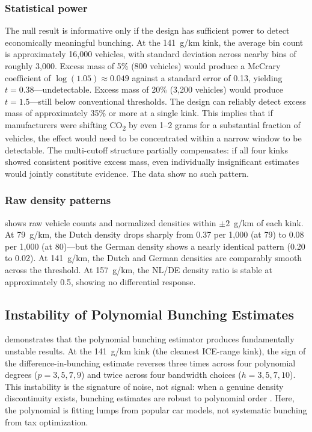 \documentclass[12pt]{article}
\begin{document}
\subsubsection*{Statistical power} The null result is informative only if the design has sufficient power to detect economically meaningful bunching. At the 141~g/km kink, the average bin count is approximately 16,000 vehicles, with standard deviation across nearby bins of roughly 3,000. Excess mass of 5\% (800 vehicles) would produce a McCrary coefficient of $\log(1.05) \approx 0.049$ against a standard error of 0.13, yielding $t = 0.38$---undetectable. Excess mass of 20\% (3,200 vehicles) would produce $t = 1.5$---still below conventional thresholds. The design can reliably detect excess mass of approximately 35\% or more at a single kink. This implies that if manufacturers were shifting CO\textsubscript{2} by even 1--2 grams for a substantial fraction of vehicles, the effect would need to be concentrated within a narrow window to be detectable. The multi-cutoff structure partially compensates: if all four kinks showed consistent positive excess mass, even individually insignificant estimates would jointly constitute evidence. The data show no such pattern.

\subsubsection*{Raw density patterns}  shows raw vehicle counts and normalized densities within $\pm 2$~g/km of each kink. At 79~g/km, the Dutch density drops sharply from 0.37 per 1,000 (at 79) to 0.08 per 1,000 (at 80)---but the German density shows a nearly identical pattern (0.20 to 0.02). At 141~g/km, the Dutch and German densities are comparably smooth across the threshold. At 157~g/km, the NL/DE density ratio is stable at approximately 0.5, showing no differential response.



\subsection{Instability of Polynomial Bunching Estimates}

 demonstrates that the polynomial bunching estimator produces fundamentally unstable results. At the 141~g/km kink (the cleanest ICE-range kink), the sign of the difference-in-bunching estimate reverses three times across four polynomial degrees ($p = 3, 5, 7, 9$) and twice across four bandwidth choices ($h = 3, 5, 7, 10$). This instability is the signature of noise, not signal: when a genuine density discontinuity exists, bunching estimates are robust to polynomial order \citep{kleven2016}. Here, the polynomial is fitting lumps from popular car models, not systematic bunching from tax optimization.
\end{document}
